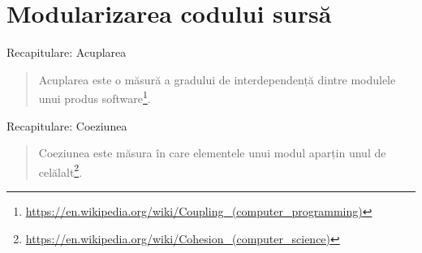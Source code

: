 \documentclass[presentation]{beamer}
\begin{document}
\section{Modularizarea codului sursă}
\label{sec:org84a2016}
\begin{frame}[label={sec:org9569cd9}]{Recapitulare: Acuplarea}
\begin{quotation} %
\alert{Acuplarea} este o măsură a gradului de interdependență dintre modulele unui produs software\footnote{\url{https://en.wikipedia.org/wiki/Coupling\_(computer\_programming)}}.
\end{quotation}
\end{frame}
\begin{frame}[label={sec:orga78ca0c}]{Recapitulare: Coeziunea}
\begin{quotation} %
\alert{Coeziunea} este măsura în care elementele unui modul aparțin unul de celălalt\footnote{\url{https://en.wikipedia.org/wiki/Cohesion\_(computer\_science)}}.
\end{quotation}
\end{frame}
\end{document}

